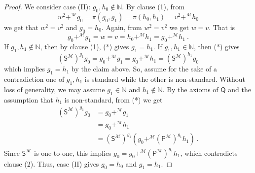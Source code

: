 \documentclass[10pt,a4paper, openany,  oldfontcommands]{memoir}
\newtheorem{open problem} [theorem] {Open Problem}
\newtheorem{open question} [theorem] {Open Question}
\renewcommand{\mathrm}{\mathsf}
\begin{document}
\begin{proof}
We consider case (II):   $  g_0, h_0  \not\in  \mathbb{N} $.
By clause (1),  from 
\[
  w^2  +^{  \mathcal{M} }   g_0 =
\pi   ( g_0, g_1)  
= 
\pi   (h_0, h_1) 
=   
    v^2  +^{  \mathcal{M} }   h_0   
  \]
we get that  $  w^2  = v^2  $  and  $  g_0 = h_0  $. 
Again, from  $  w^2  = v^2  $  we get   $  w  =  v $. 
That is 
\[
 g_0 +^{  \mathcal{M} }   g_1   =   w  =  v  =  h_0 +^{  \mathcal{M} }   h_1   =  g_0 +^{  \mathcal{M} }   h_1 
 \          .   \tag{*}
\]
If    $  g_1, h_1  \not\in   \mathbb{N} $,  then by clause (1),  (*) gives  $  g_1  =  h_1  $. 
If  $  g_1, h_1   \in   \mathbb{N} $, then     (*)    gives 
\[
\left( \mathrm{S}^{  \mathcal{M}  }  \right)^{ g_1 }   g_0  =   
 g_0 +^{  \mathcal{M} }   g_1   =    g_0 +^{  \mathcal{M} }   h_1   = 
 \left( \mathrm{S}^{  \mathcal{M}  }  \right)^{ h_1 }   g_0  
\]
which implies   $  g_1  =  h_1  $  by the claim above.
So, assume for the sake of a contradiction one of $g_1, h_1$ is standard while the other is non-standard. 
Without loss of generality, we may assume  $  g_1  \in  \mathbb{N}  $  and     $  h_1   \not\in  \mathbb{N}  $. 
By the axioms of  $  \mathsf{Q} $ and the assumption that $h_1 $ is non-standard,   from (*)   we get  
\begin{align*}
 \left(  \mathrm{S}^{   \mathcal{M} }  \right)^{ g_1 }   g_0   
 &= g_0 +^{  \mathcal{M} }   g_1 
\\
 & =     g_0   +^{  \mathcal{M} }  h_1
 \\
& =  \left(  \mathrm{S}^{   \mathcal{M} }  \right)^{ g_1 }   \left(  g_0    +^{  \mathcal{M} }      \left(  \mathrm{P}^{   \mathcal{M} }  \right)^{ g_1 }   h_1    \right)
 \     .
\end{align*}
Since  $   \mathrm{S}^{   \mathcal{M} }    $  is one-to-one,  this  implies  $ g_0 = g_0    +^{  \mathcal{M} }      \left(  \mathrm{P}^{   \mathcal{M} }  \right)^{ g_1 }   h_1    $, 
which contradicts clause (2). 
Thus, case (II) gives  $g_0 = h_0 $  and $  g_1 = h_1 $.   










\end{proof}
\end{document}

